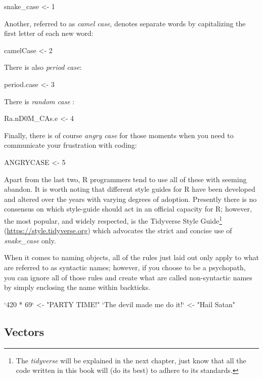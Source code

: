 \begin{inR}
snake_case <- 1
\end{inR}
\medskip

\noindent
Another, referred to as \textit{camel case}, denotes separate words by capitalizing the first letter of each new word:

\begin{inR}
camelCase <- 2
\end{inR}
\medskip

\noindent
There is also \textit{period case}:
\begin{inR}
period.case <- 3
\end{inR}
\medskip

\noindent
There is \textit{random case} \parencite{Wickham2023}:
\begin{inR}
Ra.nD0M_CAs.e <- 4
\end{inR}
\medskip

\noindent
Finally, there is of course \textit{angry case} for those moments when you need to communicate your frustration with coding:
\begin{inR}
ANGRYCASE <- 5
\end{inR}
\medskip

Apart from the last two, R programmers tend to use all of these with seeming abandon. It is worth noting that different style guides for R have been developed and altered over the years with varying degrees of adoption. Presently there is no consensus on which style-guide should act in an official capacity for R; however, the most popular, and widely respected, is the Tidyverse Style Guide\footnote{The \textit{tidyverse} will be explained in the next chapter, just know that all the code written in this book will (do its best) to adhere to its standards.} (\url{https://style.tidyverse.org}) which advocates the strict and concise use of \textit{snake\_case} only.

When it comes to naming objects, all of the rules just laid out only apply to what are referred to as \glspl{syntactic name}; however, if you choose to be a psychopath, you can ignore all of those rules and create what are called \glspl{non-syntactic name} by simply enclosing the name within backticks.

\begin{inR}
`420 * 69` <- "PARTY TIME!"
`The devil made me do it!` <- "Hail Satan"
\end{inR}

\subsection{Vectors}


